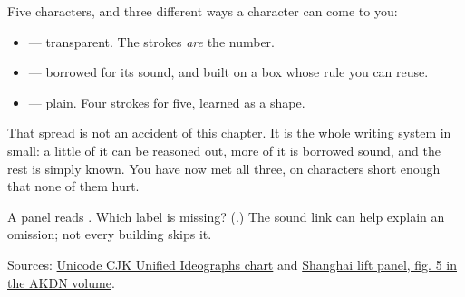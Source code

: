 \begin{grammarlens}[title={What you've built this chapter}]
Five characters, and three different ways a character can come to you:

\begin{itemize}
\raggedright
  \item \textbf{  } — transparent. The strokes \emph{are} the number.
  \item \textbf{} — borrowed for its sound, and built on a box whose rule you can reuse.
  \item \textbf{} — plain. Four strokes for five, learned as a shape.
\end{itemize}

That spread is not an accident of this chapter. It is the whole writing system in small: a little of it can be reasoned out, more of it is borrowed sound, and the rest is simply known. You have now met all three, on characters short enough that none of them hurt.
\end{grammarlens}

\begin{tcolorbox}[breakable,colback=teal!4,colframe=teal!35!black,title={Before you move on}]
A panel reads    . Which label is missing? (\textbf{}.) The sound link can help explain an omission; not every building skips it.

Sources: \href{https://www.unicode.org/charts/PDF/U4E00.pdf}{Unicode CJK Unified Ideographs chart} and \href{https://static.the.akdn/53832/1650573508-2016\_akaa\_shaping\_cities.pdf}{Shanghai lift panel, fig. 5 in the AKDN volume}.
\end{tcolorbox}

